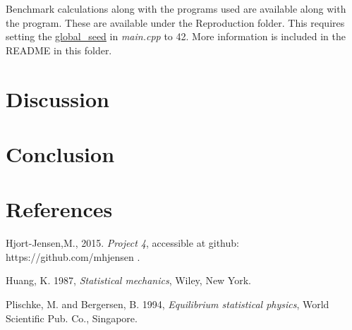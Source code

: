 \documentclass[11pt,a4paper,draft]{article}
\numberwithin{equation}{section}
\begin{document}
Benchmark calculations along with the programs used are available 
along with the program. These are available under the Reproduction folder.
This requires setting the 
\url{global_seed} in \emph{main.cpp} to 42. More information is included
in the README in this folder.

\section{Discussion}




\section{Conclusion}

\section{References}
Hjort-Jensen,M., 2015. \emph{Project 4}, accessible at github: https://github.com/mhjensen .

Huang, K. 1987, \emph{Statistical mechanics}, Wiley, New York. 

Plischke, M. and Bergersen, B. 1994, \emph{Equilibrium statistical physics}, World Scientific Pub. Co., Singapore.
\end{document}
